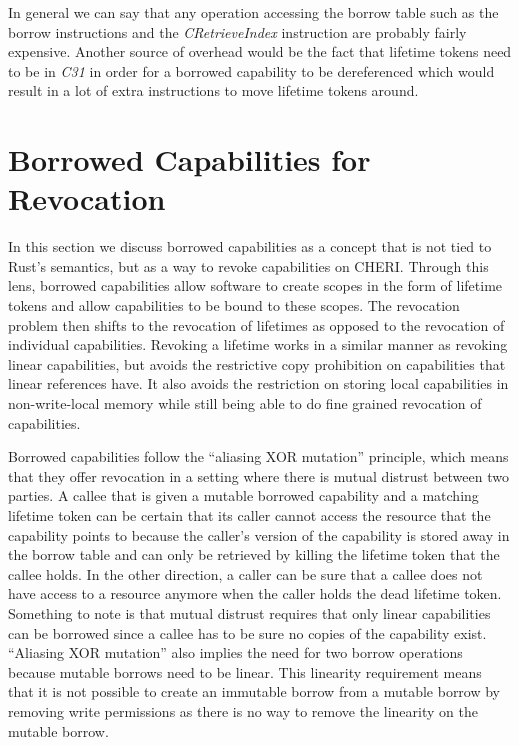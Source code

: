 In general we can say that any operation accessing the borrow table such as the borrow instructions and the \textit{CRetrieveIndex} instruction are probably fairly expensive.
Another source of overhead would be the fact that lifetime tokens need to be in \textit{C31} in order for a borrowed capability to be dereferenced which would result in a lot of extra instructions to move lifetime tokens around.

\section{Borrowed Capabilities for Revocation}
In this section we discuss borrowed capabilities as a concept that is not tied to Rust's semantics, but as a way to revoke capabilities on CHERI.
Through this lens, borrowed capabilities allow software to create scopes in the form of lifetime tokens and allow capabilities to be bound to these scopes.
The revocation problem then shifts to the revocation of lifetimes as opposed to the revocation of individual capabilities.
Revoking a lifetime works in a similar manner as revoking linear capabilities, but avoids the restrictive copy prohibition on capabilities that linear references have.
It also avoids the restriction on storing local capabilities in non-write-local memory while still being able to do fine grained revocation of capabilities.

Borrowed capabilities follow the ``aliasing XOR mutation'' principle, which means that they offer revocation in a setting where there is mutual distrust between two parties.
A callee that is given a mutable borrowed capability and a matching lifetime token can be certain that its caller cannot access the resource that the capability points to because the caller's version of the capability is stored away in the borrow table and can only be retrieved by killing the lifetime token that the callee holds.
In the other direction, a caller can be sure that a callee does not have access to a resource anymore when the caller holds the dead lifetime token.
Something to note is that mutual distrust requires that only linear capabilities can be borrowed since a callee has to be sure no copies of the capability exist.
``Aliasing XOR mutation'' also implies the need for two borrow operations because mutable borrows need to be linear.
This linearity requirement means that it is not possible to create an immutable borrow from a mutable borrow by removing write permissions as there is no way to remove the linearity on the mutable borrow.

